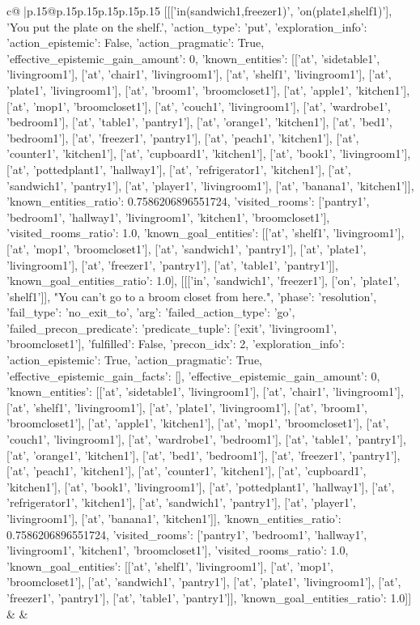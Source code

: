 \documentclass{article}
\begin{document}
{\begin{supertabular}{c@{$\;$}|p{.15\linewidth}@{}p{.15\linewidth}p{.15\linewidth}p{.15\linewidth}p{.15\linewidth}p{.15\linewidth}}
{{{	 [[['in(sandwich1,freezer1)', 'on(plate1,shelf1)'], 'You put the plate on the shelf.', {'action_type': 'put', 'exploration_info': {'action_epistemic': False, 'action_pragmatic': True, 'effective_epistemic_gain_amount': 0, 'known_entities': [['at', 'sidetable1', 'livingroom1'], ['at', 'chair1', 'livingroom1'], ['at', 'shelf1', 'livingroom1'], ['at', 'plate1', 'livingroom1'], ['at', 'broom1', 'broomcloset1'], ['at', 'apple1', 'kitchen1'], ['at', 'mop1', 'broomcloset1'], ['at', 'couch1', 'livingroom1'], ['at', 'wardrobe1', 'bedroom1'], ['at', 'table1', 'pantry1'], ['at', 'orange1', 'kitchen1'], ['at', 'bed1', 'bedroom1'], ['at', 'freezer1', 'pantry1'], ['at', 'peach1', 'kitchen1'], ['at', 'counter1', 'kitchen1'], ['at', 'cupboard1', 'kitchen1'], ['at', 'book1', 'livingroom1'], ['at', 'pottedplant1', 'hallway1'], ['at', 'refrigerator1', 'kitchen1'], ['at', 'sandwich1', 'pantry1'], ['at', 'player1', 'livingroom1'], ['at', 'banana1', 'kitchen1']], 'known_entities_ratio': 0.7586206896551724, 'visited_rooms': ['pantry1', 'bedroom1', 'hallway1', 'livingroom1', 'kitchen1', 'broomcloset1'], 'visited_rooms_ratio': 1.0, 'known_goal_entities': [['at', 'shelf1', 'livingroom1'], ['at', 'mop1', 'broomcloset1'], ['at', 'sandwich1', 'pantry1'], ['at', 'plate1', 'livingroom1'], ['at', 'freezer1', 'pantry1'], ['at', 'table1', 'pantry1']], 'known_goal_entities_ratio': 1.0}}], [[['in', 'sandwich1', 'freezer1'], ['on', 'plate1', 'shelf1']], "You can't go to a broom closet from here.", {'phase': 'resolution', 'fail_type': 'no_exit_to', 'arg': {'failed_action_type': 'go', 'failed_precon_predicate': {'predicate_tuple': ['exit', 'livingroom1', 'broomcloset1'], 'fulfilled': False, 'precon_idx': 2}}, 'exploration_info': {'action_epistemic': True, 'action_pragmatic': True, 'effective_epistemic_gain_facts': [], 'effective_epistemic_gain_amount': 0, 'known_entities': [['at', 'sidetable1', 'livingroom1'], ['at', 'chair1', 'livingroom1'], ['at', 'shelf1', 'livingroom1'], ['at', 'plate1', 'livingroom1'], ['at', 'broom1', 'broomcloset1'], ['at', 'apple1', 'kitchen1'], ['at', 'mop1', 'broomcloset1'], ['at', 'couch1', 'livingroom1'], ['at', 'wardrobe1', 'bedroom1'], ['at', 'table1', 'pantry1'], ['at', 'orange1', 'kitchen1'], ['at', 'bed1', 'bedroom1'], ['at', 'freezer1', 'pantry1'], ['at', 'peach1', 'kitchen1'], ['at', 'counter1', 'kitchen1'], ['at', 'cupboard1', 'kitchen1'], ['at', 'book1', 'livingroom1'], ['at', 'pottedplant1', 'hallway1'], ['at', 'refrigerator1', 'kitchen1'], ['at', 'sandwich1', 'pantry1'], ['at', 'player1', 'livingroom1'], ['at', 'banana1', 'kitchen1']], 'known_entities_ratio': 0.7586206896551724, 'visited_rooms': ['pantry1', 'bedroom1', 'hallway1', 'livingroom1', 'kitchen1', 'broomcloset1'], 'visited_rooms_ratio': 1.0, 'known_goal_entities': [['at', 'shelf1', 'livingroom1'], ['at', 'mop1', 'broomcloset1'], ['at', 'sandwich1', 'pantry1'], ['at', 'plate1', 'livingroom1'], ['at', 'freezer1', 'pantry1'], ['at', 'table1', 'pantry1']], 'known_goal_entities_ratio': 1.0}}]] 
	  } 
	   } 
	   } 
	 & & \\ 
 


\end{supertabular}}
\end{document}
